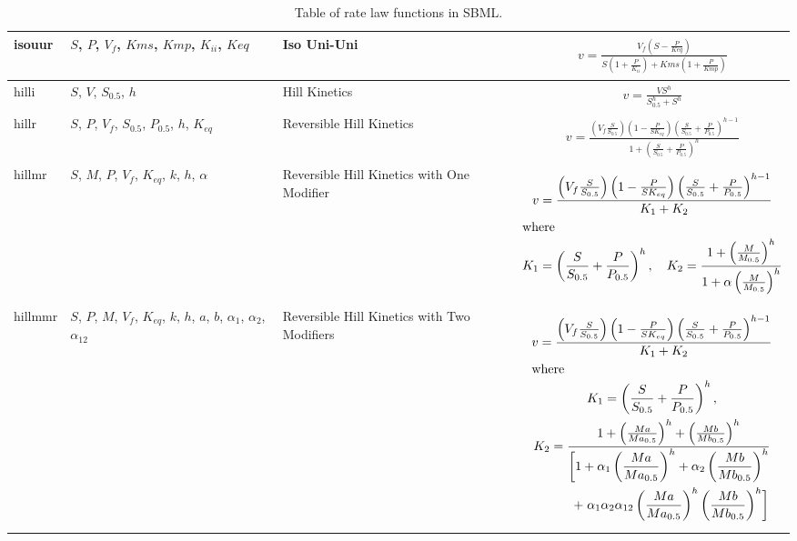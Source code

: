 \documentclass[10pt]{cek-article}
\begin{document}
\begin{table}[ht]
\begin{tabular}{|m{0.5in}|>{\raggedright}m{0.77in}|>{\raggedright}m{1.5in}|m{3.2in}|}
isouur & $S$, $P$, $V_f$, $Kms$, $Kmp$, $K_{ii}$, $Keq$ & Iso Uni-Uni &
\begin{gather*}
v = \frac{V_f \left(S - \frac{P}{Keq}\right)}{S \left(1
+ \frac{P}{K_{ii}}\right) + Kms \left(1 + \frac{P}{Kmp}\right)}
\end{gather*}
\\ \hline

hilli & $S$, $V$, $S_{0.5}$, $h$ & Hill Kinetics &
\begin{gather*}
v = \frac{V S^h}{S_{0.5}^h + S^h}
\end{gather*}
\\ \hline

hillr & $S$, $P$, $V_f$, $S_{0.5}$, $P_{0.5}$, $h$, $K_{eq}$ & Reversible
Hill Kinetics &
\begin{gather*}
v = \frac{\left(V_f \frac{S}{S_{0.5}}
\right) \left(1 - \frac{P}{S K_{eq}} \right)
\left(\frac{S}{S_{0.5}} + \frac{P}{P_{0.5}}\right)^{h-1}}{1 +
\left(\frac{S}{S_{0.5}} + \frac{P}{P_{0.5}}\right)^h}
\end{gather*}
\\ \hline

hillmr & $S$, $M$, $P$, $V_f$, $K_{eq}$, $k$, $h$, $\alpha$ & Reversible Hill
Kinetics with One Modifier &
\begin{gather*}
v = \frac{\left(V_f
\frac{S}{S_{0.5}} \right) \left(1 - \frac{P}{S K_{eq}} \right)
\left(\frac{S}{S_{0.5}} + \frac{P}{P_{0.5}}\right)^{h-1}} {K_1 +
K_2} \\
\intertext{where}
K_1 = \left(\frac{S}{S_{0.5}} +
\frac{P}{P_{0.5}}\right)^h, \quad K_2 = \frac{1 + \left(\frac{M}{M_{0.5}}\right)^h}{1
  + \alpha \left(\frac{M}{M_{0.5}}\right)^h}
\end{gather*}
\\ \hline

hillmmr & $S$, $P$, $M$, $V_f$, $K_{eq}$, $k$, $h$, $a$, $b$, $\alpha_1$, $\alpha_2$, $\alpha_{12}$ &
Reversible Hill Kinetics with Two Modifiers &
\begin{gather*}
v = \frac{\left(V_f
\frac{S}{S_{0.5}} \right) \left(1 - \frac{P}{S K_{eq}} \right)
\left(\frac{S}{S_{0.5}} + \frac{P}{P_{0.5}}\right)^{h-1}} {K_1 +
K_2} \\
\intertext{where}
K_1 = \left(\frac{S}{S_{0.5}} + \frac{P}{P_{0.5}}\right)^h ,\\
K_2 = \frac{1 + \left(\frac{Ma}{Ma_{0.5}}\right)^h + \left( \frac{Mb}{Mb_{0.5}}
\right)^h }{\begin{split}
\biggl[ 1 + \alpha_1 \left(\frac{Ma}{Ma_{0.5}}\right)^h +
\alpha_2 \left(\frac{Mb}{Mb_{0.5}}\right)^h \\
+\; \alpha_1 \alpha_2
\alpha_{12} \left( \frac{Ma}{Ma_{0.5}} \right)^h \left(
  \frac{Mb}{Mb_{0.5}} \right)^h \biggr] \end{split} }
\end{gather*}
\\ \hline

\end{tabular}
\caption{Table of rate law functions in SBML.}
\label{tab:ratelaws}
\end{table}
\end{document}
